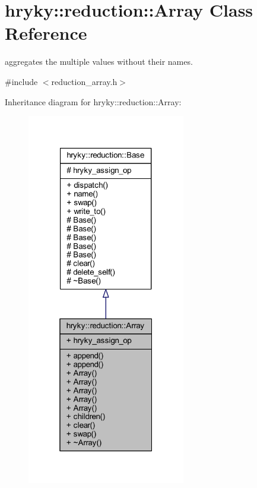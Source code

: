 \hypertarget{classhryky_1_1reduction_1_1_array}{\section{hryky\-:\-:reduction\-:\-:Array Class Reference}
\label{classhryky_1_1reduction_1_1_array}
}


aggregates the multiple values without their names.  




{\ttfamily \#include $<$reduction\-\_\-array.\-h$>$}



Inheritance diagram for hryky\-:\-:reduction\-:\-:Array\-:
\nopagebreak
\begin{figure}[H]
\begin{center}
\leavevmode
\includegraphics[width=196pt]{classhryky_1_1reduction_1_1_array__inherit__graph}
\end{center}
\end{figure}
